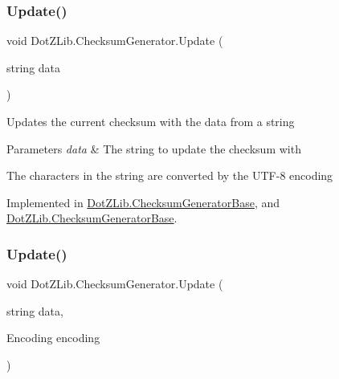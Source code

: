 \mbox{\label{interface_dot_z_lib_1_1_checksum_generator_ac5a728d2dd56479b429648177607fd39}} 
\subsubsection{\texorpdfstring{Update()}{Update()}\hspace{0.1cm}{\footnotesize\ttfamily [6/8]}}
{\footnotesize\ttfamily void Dot\+Z\+Lib.\+Checksum\+Generator.\+Update (\begin{DoxyParamCaption}\item[{string}]{data }\end{DoxyParamCaption})}



Updates the current checksum with the data from a string 


\begin{DoxyParams}{Parameters}
{\em data} & The string to update the checksum with\\
\hline
\end{DoxyParams}


The characters in the string are converted by the U\+T\+F-\/8 encoding

Implemented in \hyperlink{class_dot_z_lib_1_1_checksum_generator_base_a4f0a5411dbb86714571852000932d66e}{Dot\+Z\+Lib.\+Checksum\+Generator\+Base}, and \hyperlink{class_dot_z_lib_1_1_checksum_generator_base_a4f0a5411dbb86714571852000932d66e}{Dot\+Z\+Lib.\+Checksum\+Generator\+Base}.

\mbox{\label{interface_dot_z_lib_1_1_checksum_generator_ab894f35764ea30031c616517a6a00391}} 
\subsubsection{\texorpdfstring{Update()}{Update()}\hspace{0.1cm}{\footnotesize\ttfamily [7/8]}}
{\footnotesize\ttfamily void Dot\+Z\+Lib.\+Checksum\+Generator.\+Update (\begin{DoxyParamCaption}\item[{string}]{data,  }\item[{Encoding}]{encoding }\end{DoxyParamCaption})}



